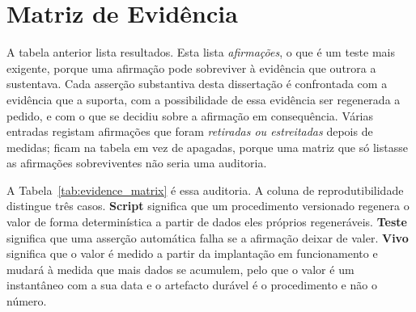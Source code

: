 \section{Matriz de Evidência}
\label{app:evidence_matrix}

A tabela anterior lista resultados. Esta lista \emph{afirmações}, o que é um teste mais exigente,
porque uma afirmação pode sobreviver à evidência que outrora a sustentava. Cada asserção substantiva
desta dissertação é confrontada com a evidência que a suporta, com a possibilidade de essa evidência
ser regenerada a pedido, e com o que se decidiu sobre a afirmação em consequência. Várias entradas
registam afirmações que foram \emph{retiradas ou estreitadas} depois de medidas; ficam na tabela em vez
de apagadas, porque uma matriz que só listasse as afirmações sobreviventes não seria uma auditoria.

A Tabela~\ref{tab:evidence_matrix} é essa auditoria. A coluna de reprodutibilidade distingue três casos. \textbf{Script} significa que um procedimento
versionado regenera o valor de forma determinística a partir de dados eles próprios regeneráveis.
\textbf{Teste} significa que uma asserção automática falha se a afirmação deixar de valer.
\textbf{Vivo} significa que o valor é medido a partir da implantação em funcionamento e mudará à
medida que mais dados se acumulem, pelo que o valor é um instantâneo com a sua data e o artefacto
durável é o procedimento e não o número.

